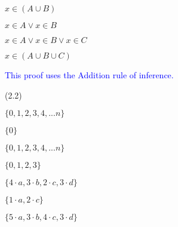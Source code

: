 \documentclass{exam}
\begin{document}
\begin{questions}
\begin{subparts}
\begin{center}
\(x \in (A \cup B)\)

\(x \in A \lor x \in B \)

\(x \in A \lor x \in B \lor x \in C\)

\(x \in (A \cup B \cup C) \)

\textcolor{blue}{This proof uses the Addition rule of inference.}

\end{center}

\end{subparts}

 (2.2)
\begin{subparts}

\begin{center}
\( \{0,1,2,3,4,...n\} \)
\end{center}


\begin{center}
\( \{0\} \)
\end{center}


\begin{center}
\( \{0,1,2,3,4,...n\} \)
\end{center}


\begin{center}
\( \{0,1,2,3\} \)
\end{center}

\end{subparts}

\begin{subparts}

\begin{center}
\( \{4 \cdot a, 3 \cdot b, 2 \cdot c, 3 \cdot d\} \)
\end{center}


\begin{center}
\( \{1 \cdot a, 2 \cdot c\} \)
\end{center}


\begin{center}
\( \{5 \cdot a, 3 \cdot b, 4 \cdot c, 3 \cdot d\} \)
\end{center}


\end{subparts}
\end{questions}
\end{document}
